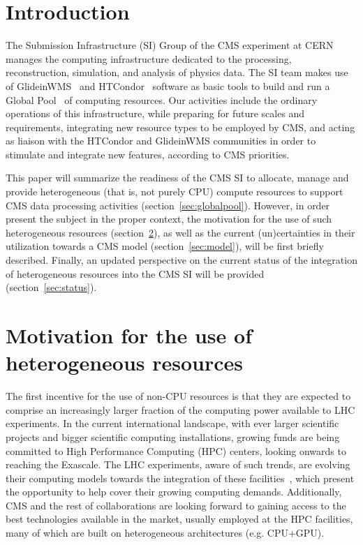 \documentclass{webofc}
\begin{document}
\section{Introduction}
\label{sec:intro}
The Submission Infrastructure (SI) Group of the CMS experiment at CERN manages the computing infrastructure dedicated to the processing, reconstruction, simulation, and analysis of physics data. The SI team makes use of GlideinWMS~\cite{gwms} and HTCondor~\cite{htcondor} software as basic tools to build and run a Global Pool~\cite{global_pool} of computing resources. Our activities include the ordinary operations of this infrastructure, while preparing for future scales and requirements, integrating new resource types to be employed by CMS, and acting as liaison with the HTCondor and GlideinWMS communities in order to stimulate and integrate new features, according to CMS priorities.  

This paper will summarize the readiness of the CMS SI to allocate, manage and provide heterogeneous (that is, not purely CPU) compute resources to support CMS data processing activities (section~\ref{sec:globalpool}). However, in order present the subject in the proper context, the motivation for the use of such heterogeneous resources (section~\ref{sec:motivation}), as well as the current (un)certainties in their utilization towards a CMS model (section~\ref{sec:model}), will be first briefly described. Finally, an updated perspective on the current status of the integration of heterogeneous resources into the CMS SI will be provided (section~\ref{sec:status}). 


\section{Motivation for the use of heterogeneous resources}
\label{sec:motivation}

The first incentive for the use of non-CPU resources is that they are expected to comprise an increasingly larger fraction of the computing power available to LHC experiments. In the current international landscape, with ever larger scientific projects and bigger scientific computing installations, growing funds are being committed to High Performance Computing (HPC) centers, looking onwards to reaching the Exascale. The LHC experiments, aware of such trends, are evolving their computing models towards the integration of these facilities~\cite{hpc}, which present the opportunity to help cover their growing computing demands. Additionally, CMS and the rest of collaborations are looking forward to gaining access to the best technologies available in the market, usually employed at the HPC facilities, many of which are built on heterogeneous architectures (e.g. CPU+GPU).
\end{document}
